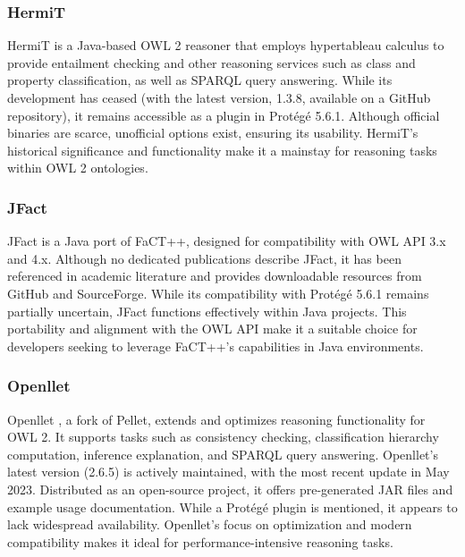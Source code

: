 \subsubsection{HermiT}
HermiT \cite{glimmHermiTOWL22014} is a Java-based OWL 2 reasoner that employs hypertableau calculus to provide entailment checking and other reasoning services such as class and property classification, as well as SPARQL query answering. While its development has ceased (with the latest version, 1.3.8, available on a GitHub repository), it remains accessible as a plugin in Protégé 5.6.1. Although official binaries are scarce, unofficial options exist, ensuring its usability. HermiT's historical significance and functionality make it a mainstay for reasoning tasks within OWL 2 ontologies.

\subsubsection{JFact}
JFact \cite{JFactDLReasoner} is a Java port of FaCT++, designed for compatibility with OWL API 3.x and 4.x. Although no dedicated publications describe JFact, it has been referenced in academic literature and provides downloadable resources from GitHub and SourceForge. While its compatibility with Protégé 5.6.1 remains partially uncertain, JFact functions effectively within Java projects. This portability and alignment with the OWL API make it a suitable choice for developers seeking to leverage FaCT++'s capabilities in Java environments.

\subsubsection{Openllet}
Openllet \cite{galigatorGaligatorOpenllet2024}, a fork of Pellet, extends and optimizes reasoning functionality for OWL 2. It supports tasks such as consistency checking, classification hierarchy computation, inference explanation, and SPARQL query answering. Openllet's latest version (2.6.5) is actively maintained, with the most recent update in May 2023. Distributed as an open-source project, it offers pre-generated JAR files and example usage documentation. While a Protégé plugin is mentioned, it appears to lack widespread availability. Openllet’s focus on optimization and modern compatibility makes it ideal for performance-intensive reasoning tasks.

